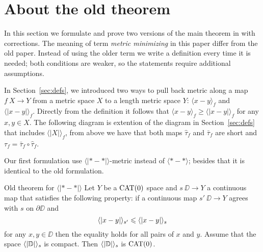 \section{About the old theorem}\label{sec:old-thm}

In this section we formulate and prove two versions of the main theorem in \cite{petrunin-metric-min} with corrections.
The meaning of term \emph{metric minimizing} in this paper differ from the old paper.
Instead of using the older term we write a definition every time it is needed;
both conditions are weaker, so the statements require additional assumptions.

In Section~\ref{sec:defs}, we introduced two ways to pull back metric along a map $f\:X\to Y$ from a metric space $X$ to a length metric space $Y$:
$\langle x-y\rangle_f$ and $\langle| x-y|\rangle_f$.
Directly from the definition it follows that  $\langle x-y\rangle_f\ge \langle| x-y|\rangle_f$ for any $x,y\in X$.
The following diagram is extention of the diagram in Section~\ref{sec:defs} that includes $\langle|X|\rangle_f$, from above we have that both maps $\hat\tau_f$ and $\bar\tau_f$ are short and $\tau_f=\bar\tau_f\circ\hat\tau_f$.

\begin{figure}
\centering
{}
\end{figure}

Our first formulation use $\langle|{*}-{*}|\rangle$-metric instead of $\langle{*}-{*}\rangle$; besides that it is identical to the old formulation.

\begin{thm}{Old theorem for $\bm{\langle|{*}-{*}|\rangle}$}\label{thm:old1}
Let $Y$ be a $\mathop{\rm CAT}\nolimits(0)$ space and $s\:\DD\to Y$ a continuous map that satisfies the following property: 
if a continuous map $s'\:\DD\to Y$ agrees with $s$ on $\partial\DD$ and
\[\langle|x-y|\rangle_{s'}\leqslant \langle|x-y|\rangle_{s}\]
for any $x,y\in \DD$
then the equality holds for all pairs of $x$ and $y$.
Assume that the space $\langle|\mathbb{D}|\rangle_s$ is compact.
Then $\langle|\mathbb{D}|\rangle_s$ is $\mathop{\rm CAT}\nolimits(0)$.
\end{thm}

